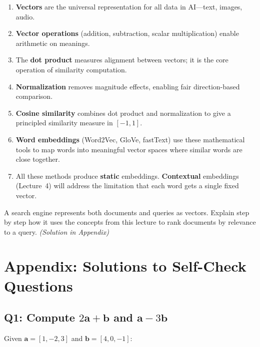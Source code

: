 \documentclass[11pt,a4paper]{article}
\begin{document}
\begin{enumerate}[leftmargin=1.5em]
    \item \textbf{Vectors} are the universal representation for all data in AI---text, images, audio.
    \item \textbf{Vector operations} (addition, subtraction, scalar multiplication) enable arithmetic on meanings.
    \item The \textbf{dot product} measures alignment between vectors; it is the core operation of similarity computation.
    \item \textbf{Normalization} removes magnitude effects, enabling fair direction-based comparison.
    \item \textbf{Cosine similarity} combines dot product and normalization to give a principled similarity measure in $[-1, 1]$.
    \item \textbf{Word embeddings} (Word2Vec, GloVe, fastText) use these mathematical tools to map words into meaningful vector spaces where similar words are close together.
    \item All these methods produce \textbf{static} embeddings. \textbf{Contextual} embeddings (Lecture~4) will address the limitation that each word gets a single fixed vector.
\end{enumerate}

\begin{tcolorbox}[questionbox={Self-Check Q7}]
A search engine represents both documents and queries as vectors. Explain step by step how it uses the concepts from this lecture to rank documents by relevance to a query. \textit{(Solution in Appendix)}
\end{tcolorbox}

\newpage
\section*{Appendix: Solutions to Self-Check Questions}

\subsection*{Q1: Compute $2\mathbf{a} + \mathbf{b}$ and $\mathbf{a} - 3\mathbf{b}$}

Given $\mathbf{a} = [1, -2, 3]$ and $\mathbf{b} = [4, 0, -1]$:
\end{document}
